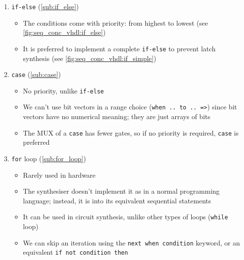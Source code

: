 \begin{enumerate}

\item \verb|if-else| (\ref{sub:if_else})

	\begin{itemize}
	\item The conditions come with priority: from highest to lowest (see \autoref{fig:seq_conc_vhdl:if_else})
	
	\item It is preferred to implement a complete \verb|if-else| to prevent latch synthesis (see \autoref{fig:seq_conc_vhdl:if_simple})
	
	\end{itemize}

\item \verb|case| (\ref{sub:case})

	\begin{itemize}
	\item No priority, unlike \verb|if-else|
	
	\item We can't use bit vectors in a range choice (\verb|when .. to .. =>|) since bit vectors have no numerical meaning; they are just arrays of bits
	
	\item The MUX of a \verb|case| has fewer gates, so if no priority is required, \verb|case| is preferred
	\end{itemize}
	
\item \verb|for| loop (\ref{sub:for_loop})	

	\begin{itemize}
	
	\item Rarely used in hardware
	
	\item The synthesiser doesn't implement it as in a normal programming language; instead, it is  into its equivalent sequential statements
	
	\item It can be used in circuit synthesis, unlike other types of loops (\verb|while| loop)
	
	\item We can skip an iteration using the \verb|next when condition| keyword, or an equivalent \verb|if not condition then|	
	
	\end{itemize}

\end{enumerate}

